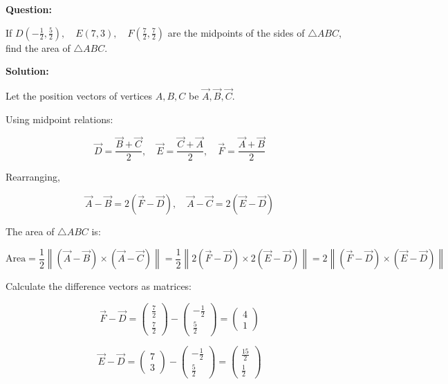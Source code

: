 \documentclass[journal]{IEEEtran}
\begin{document}
\textbf{Question:}

If \( D\left(-\frac{1}{2}, \frac{5}{2}\right), \quad E(7,3), \quad F\left(\frac{7}{2}, \frac{7}{2}\right) \) are the midpoints of the sides of \(\triangle ABC\), find the area of \(\triangle ABC\).

\vspace{1em}

\textbf{Solution:}

Let the position vectors of vertices \(A, B, C\) be \(\vec{A}, \vec{B}, \vec{C}\).

Using midpoint relations:

\[
\vec{D} = \frac{\vec{B} + \vec{C}}{2}, \quad \vec{E} = \frac{\vec{C} + \vec{A}}{2}, \quad \vec{F} = \frac{\vec{A} + \vec{B}}{2}
\]

Rearranging,

\[
\vec{A} - \vec{B} = 2(\vec{F} - \vec{D}), \quad \vec{A} - \vec{C} = 2(\vec{E} - \vec{D})
\]

The area of \(\triangle ABC\) is:

\[
\text{Area} = \frac{1}{2} \left\| (\vec{A} - \vec{B}) \times (\vec{A} - \vec{C}) \right\| = \frac{1}{2} \left\| 2(\vec{F} - \vec{D}) \times 2(\vec{E} - \vec{D}) \right\| = 2 \left\| (\vec{F} - \vec{D}) \times (\vec{E} - \vec{D}) \right\|
\]

Calculate the difference vectors as matrices:

\[
\vec{F} - \vec{D} =
\begin{pmatrix}
\frac{7}{2} \\
\frac{7}{2}
\end{pmatrix}
-
\begin{pmatrix}
-\frac{1}{2} \\
\frac{5}{2}
\end{pmatrix}
=
\begin{pmatrix}
4 \\
1
\end{pmatrix}
\]

\[
\vec{E} - \vec{D} =
\begin{pmatrix}
7 \\
3
\end{pmatrix}
-
\begin{pmatrix}
-\frac{1}{2} \\
\frac{5}{2}
\end{pmatrix}
=
\begin{pmatrix}
\frac{15}{2} \\
\frac{1}{2}
\end{pmatrix}
\]
\end{document}
